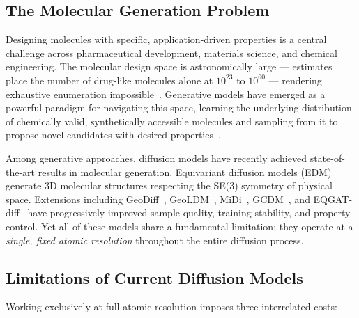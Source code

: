 \documentclass[11pt,a4paper]{article}
\begin{document}
\subsection{The Molecular Generation Problem}

Designing molecules with specific, application-driven properties is a central challenge
across pharmaceutical development, materials science, and chemical engineering. The
molecular design space is astronomically large --- estimates place the number of
drug-like molecules alone at $10^{23}$ to $10^{60}$ --- rendering exhaustive enumeration
impossible~\citep{bilodeau2022generative}. Generative models have emerged as a powerful
paradigm for navigating this space, learning the underlying distribution of chemically
valid, synthetically accessible molecules and sampling from it to propose novel candidates
with desired properties~\citep{gomez2018automatic}.

Among generative approaches, diffusion models have recently achieved state-of-the-art
results in molecular generation. Equivariant diffusion models (EDM)~\citep{hoogeboom2022edm}
generate 3D molecular structures respecting the SE(3) symmetry of physical space.
Extensions including GeoDiff~\citep{xu2023geodiff}, GeoLDM~\citep{xu2023geoldm},
MiDi~\citep{vignac2023midi}, GCDM~\citep{morehead2024gcdm}, and
EQGAT-diff~\citep{le2024eqgat} have progressively improved sample quality, training
stability, and property control. Yet all of these models share a fundamental limitation:
they operate at a \emph{single, fixed atomic resolution} throughout the entire diffusion
process.

\subsection{Limitations of Current Diffusion Models}

Working exclusively at full atomic resolution imposes three interrelated costs:
\end{document}
